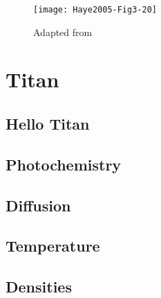 \documentclass{report}
\begin{document}
\tableofcontents

\begin{figure}
\centering
\texttt{[image: Haye2005-Fig3-20]}
\caption{Adapted from \cite{Haye2005}}
\end{figure}

\part{Titan}
\chapter{Hello Titan}


\chapter{Photochemistry}


\chapter{Diffusion}


\chapter{Temperature}


\chapter{Densities}


\clearpage


\end{document}
